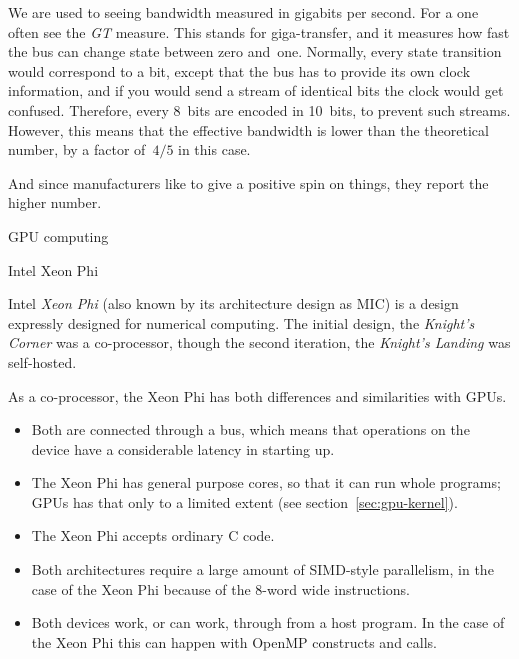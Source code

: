  We are used to seeing bandwidth
measured in gigabits per second. For a  one often
see the \emph{GT} measure. This stands
for giga-transfer, and it measures how fast the bus can change state
between zero and~one.
Normally, every state transition would correspond to a bit, except that
the bus has to provide its own clock information, and if you would send a stream
of identical bits the clock would get confused. Therefore, every 8~bits
are encoded in 10~bits, to prevent such streams. However, this means
that the effective bandwidth is lower than the theoretical number,
by a factor of~$4/5$ in this case.

And since manufacturers like to give a positive spin on things,
they report the higher number.

 {GPU computing}
\label{sec:gpu}


 {Intel Xeon Phi}

Intel \emph{Xeon Phi}
(also known by its architecture design as \ac{MIC})
is a design expressly designed for numerical computing.
The initial design, the
%
\emph{Knight's Corner}%
was a co-processor, though the second iteration, the
\emph{Knight's Landing}%
was self-hosted.

As a co-processor, the Xeon Phi has both differences and similarities with \acp{GPU}.
\begin{itemize}
\item Both are connected through a  bus, which means
  that operations on the device have a considerable latency in
  starting up.
\item The Xeon Phi has general purpose cores, so that it can run whole
  programs; \acp{GPU} has that only to a limited extent (see
  section~\ref{sec:gpu-kernel}).
\item The Xeon Phi accepts ordinary C code.
\item Both architectures require a large amount of SIMD-style
  parallelism, in the case of the Xeon Phi because of the 8-word wide
   instructions.
\item Both devices work, or can work, through 
  from a host program. In the case of the Xeon Phi this can happen
  with OpenMP constructs and  calls.
\end{itemize}

